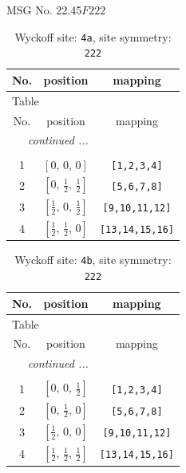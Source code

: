 \documentclass[fleqn,8pt]{jsarticle}
\begin{document}
\setcounter{MaxMatrixCols}{32}

\renewcommand{\tablename}{Table~}
\renewcommand{\figurename}{Figure~}
\begin{center}
\LARGE
MSG No. 22.45\quad$F222$
\end{center}
\renewcommand{\arraystretch}{1.2}
\begin{longtable}{ccc}
\caption{Wyckoff site: {\tt 4a}, site symmetry: {\tt 222}}
 \\
 \hline \hline
No. & position & mapping \\ \hline \endfirsthead

\multicolumn{2}{l}{\tablename\ \thetable{}} \\
 \hline \hline
No. & position & mapping \\ \hline \endhead

 \hline \hline
\multicolumn{2}{r}{\footnotesize\it continued ...} \\ \endfoot

 \hline \hline
\multicolumn{2}{r}{} \\ \endlastfoot

1 & $\left[ 0,\, 0,\, 0 \right]$ & {\tt [1,2,3,4]} \\ \hline
2 & $\left[ 0,\, \frac{1}{2},\, \frac{1}{2} \right]$ & {\tt [5,6,7,8]} \\ \hline
3 & $\left[ \frac{1}{2},\, 0,\, \frac{1}{2} \right]$ & {\tt [9,10,11,12]} \\ \hline
4 & $\left[ \frac{1}{2},\, \frac{1}{2},\, 0 \right]$ & {\tt [13,14,15,16]} \\
\end{longtable}
\renewcommand{\arraystretch}{1.2}
\begin{longtable}{ccc}
\caption{Wyckoff site: {\tt 4b}, site symmetry: {\tt 222}}
 \\
 \hline \hline
No. & position & mapping \\ \hline \endfirsthead

\multicolumn{2}{l}{\tablename\ \thetable{}} \\
 \hline \hline
No. & position & mapping \\ \hline \endhead

 \hline \hline
\multicolumn{2}{r}{\footnotesize\it continued ...} \\ \endfoot

 \hline \hline
\multicolumn{2}{r}{} \\ \endlastfoot

1 & $\left[ 0,\, 0,\, \frac{1}{2} \right]$ & {\tt [1,2,3,4]} \\ \hline
2 & $\left[ 0,\, \frac{1}{2},\, 0 \right]$ & {\tt [5,6,7,8]} \\ \hline
3 & $\left[ \frac{1}{2},\, 0,\, 0 \right]$ & {\tt [9,10,11,12]} \\ \hline
4 & $\left[ \frac{1}{2},\, \frac{1}{2},\, \frac{1}{2} \right]$ & {\tt [13,14,15,16]} \\
\end{longtable}
\end{document}
